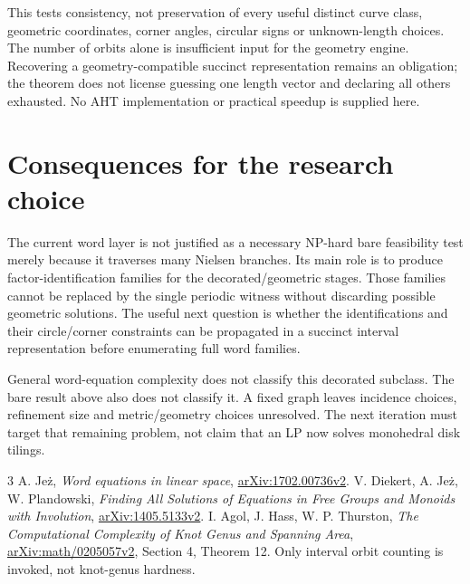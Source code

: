 \documentclass[11pt]{article}
\begin{document}
This tests consistency, not preservation of every useful distinct curve class,
geometric coordinates, corner angles, circular signs or unknown-length choices.
The number of orbits alone is insufficient input for the geometry engine.
Recovering a geometry-compatible succinct representation remains an obligation;
the theorem does not license guessing one length vector and declaring all
others exhausted. No AHT implementation or practical speedup is supplied here.

\section{Consequences for the research choice}

The current word layer is not justified as a necessary NP-hard bare feasibility
test merely because it traverses many Nielsen branches. Its main role is to
produce factor-identification families for the decorated/geometric stages.
Those families cannot be replaced by the single periodic witness without
discarding possible geometric solutions. The useful next question is whether
the identifications and their circle/corner constraints can be propagated in
a succinct interval representation before enumerating full word families.

General word-equation complexity \cite{Jez,DJP} does not classify this decorated
subclass. The bare result above also does not classify it. A fixed graph leaves
incidence choices, refinement size and metric/geometry choices unresolved.
The next iteration must target that remaining problem, not claim that an LP
now solves monohedral disk tilings.

\begin{thebibliography}{3}
 A. Je\.{z}, \emph{Word equations in linear space},
\href{https://arxiv.org/abs/1702.00736}{arXiv:1702.00736v2}.
 V. Diekert, A. Je\.{z}, W. Plandowski,
\emph{Finding All Solutions of Equations in Free Groups and Monoids with Involution},
\href{https://arxiv.org/abs/1405.5133}{arXiv:1405.5133v2}.
 I. Agol, J. Hass, W. P. Thurston,
\emph{The Computational Complexity of Knot Genus and Spanning Area},
\href{https://arxiv.org/html/math/0205057v2}{arXiv:math/0205057v2}, Section 4,
Theorem 12. Only interval orbit counting is invoked, not knot-genus hardness.
\end{thebibliography}
\end{document}
